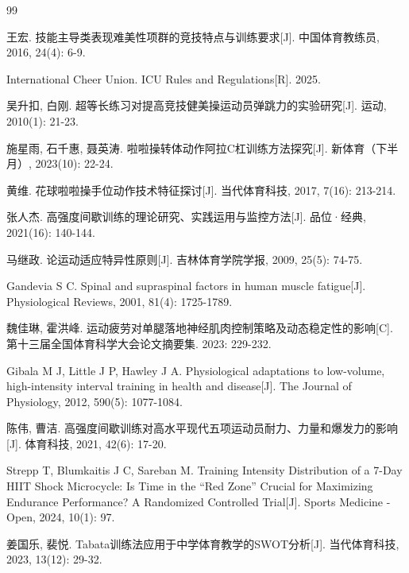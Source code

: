 \documentclass[a4paper,12pt]{article}
\newcommand{\huawenzhongsong}{\CJKfamily{zhwsong}}
\newcommand{\xiaosi}{\fontsize{12}{18}\selectfont}
\begin{document}
\renewcommand\refname{}
\begin{thebibliography}{99}
\setlength{\itemsep}{0.5em}
\setlength{\parsep}{0em}
\setlength{\leftmargin}{0em}
\setlength{\labelwidth}{0em}
\setlength{\labelsep}{0em}
\setlength{\bibindent}{2em}
{\huawenzhongsong\xiaosi

王宏. 技能主导类表现难美性项群的竞技特点与训练要求[J]. 中国体育教练员, 2016, 24(4): 6-9.

International Cheer Union. ICU Rules and Regulations[R]. 2025.

吴升扣, 白刚. 超等长练习对提高竞技健美操运动员弹跳力的实验研究[J]. 运动, 2010(1): 21-23.

施星雨, 石千惠, 聂英涛. 啦啦操转体动作阿拉C杠训练方法探究[J]. 新体育（下半月）, 2023(10): 22-24.

黄维. 花球啦啦操手位动作技术特征探讨[J]. 当代体育科技, 2017, 7(16): 213-214.

张人杰. 高强度间歇训练的理论研究、实践运用与监控方法[J]. 品位·经典, 2021(16): 140-144.

马继政. 论运动适应特异性原则[J]. 吉林体育学院学报, 2009, 25(5): 74-75.

Gandevia S C. Spinal and supraspinal factors in human muscle fatigue[J]. Physiological Reviews, 2001, 81(4): 1725-1789.

魏佳琳, 霍洪峰. 运动疲劳对单腿落地神经肌肉控制策略及动态稳定性的影响[C]. 第十三届全国体育科学大会论文摘要集. 2023: 229-232.

Gibala M J, Little J P, Hawley J A. Physiological adaptations to low-volume, high-intensity interval training in health and disease[J]. The Journal of Physiology, 2012, 590(5): 1077-1084.

陈伟, 曹洁. 高强度间歇训练对高水平现代五项运动员耐力、力量和爆发力的影响[J]. 体育科技, 2021, 42(6): 17-20.

Strepp T, Blumkaitis J C, Sareban M. Training Intensity Distribution of a 7-Day HIIT Shock Microcycle: Is Time in the ``Red Zone'' Crucial for Maximizing Endurance Performance? A Randomized Controlled Trial[J]. Sports Medicine - Open, 2024, 10(1): 97.

姜国乐, 裴悦. Tabata训练法应用于中学体育教学的SWOT分析[J]. 当代体育科技, 2023, 13(12): 29-32.

}
\end{thebibliography}
\end{document}
